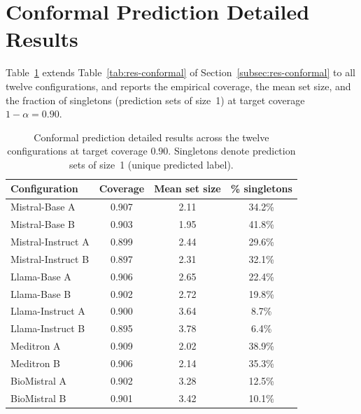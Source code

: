 \section{Conformal Prediction Detailed Results}
\label{sec:app-conformal}

Table~\ref{tab:app-conformal} extends Table~\ref{tab:res-conformal} of 
Section~\ref{subsec:res-conformal} to all twelve configurations, and 
reports the empirical coverage, the mean set size, and the fraction of 
singletons (prediction sets of size~1) at target coverage 
$1 - \alpha = 0.90$.

\begin{table}[htbp]
    \centering
    \caption{Conformal prediction detailed results across the twelve 
        configurations at target coverage $0.90$. Singletons denote 
        prediction sets of size~1 (unique predicted label).}
    \label{tab:app-conformal}
    \small
    \begin{tabular}{@{}lccc@{}}
        \toprule
        \textbf{Configuration} & 
        \textbf{Coverage} & 
        \textbf{Mean set size} & 
        \textbf{\% singletons} \\
        \midrule
        Mistral-Base A     & 0.907 & 2.11 & 34.2\% \\
        Mistral-Base B     & 0.903 & 1.95 & 41.8\% \\
        Mistral-Instruct A & 0.899 & 2.44 & 29.6\% \\
        Mistral-Instruct B & 0.897 & 2.31 & 32.1\% \\
        Llama-Base A       & 0.906 & 2.65 & 22.4\% \\
        Llama-Base B       & 0.902 & 2.72 & 19.8\% \\
        Llama-Instruct A   & 0.900 & 3.64 & 8.7\%  \\
        Llama-Instruct B   & 0.895 & 3.78 & 6.4\%  \\
        Meditron A         & 0.909 & 2.02 & 38.9\% \\
        Meditron B         & 0.906 & 2.14 & 35.3\% \\
        BioMistral A       & 0.902 & 3.28 & 12.5\% \\
        BioMistral B       & 0.901 & 3.42 & 10.1\% \\
        \bottomrule
    \end{tabular}
\end{table}

